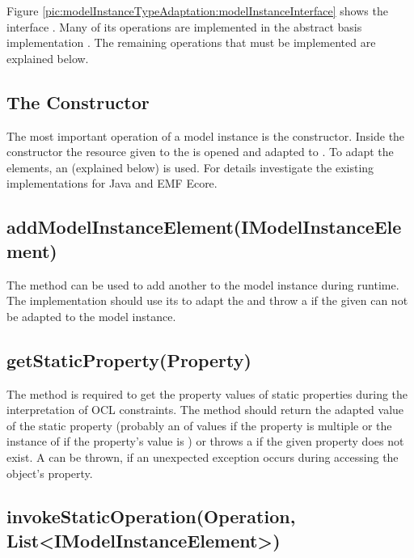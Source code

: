 Figure \ref{pic:modelInstanceTypeAdaptation:modelInstanceInterface} shows the interface . Many of its operations are implemented in the abstract basis implementation . The remaining operations that must be implemented are explained below.


\subsection{The Constructor}

The most important operation of a model instance is the constructor. Inside the constructor the resource given to the  is opened and adapted to . To adapt the elements, an  (explained below) is used. For details investigate the existing  implementations for Java and \acs{EMF} Ecore.


\subsection{addModelInstanceElement(IModelInstanceElement)}
\label{sect:modelInstanceTypeAdaptation:addIMIElement}

The method  can be used to add another  to the model instance during runtime. The implementation should use its  to adapt the  and throw a  if the given  can not be adapted to the model instance.


\subsection{getStaticProperty(Property)}

The method  is required to get the property values of static properties during the interpretation of \acs{OCL} constraints. The method should return the adapted value of the static property (probably an  of values if the property is multiple or the instance of  if the property's value is ) or throws a  if the given property does not exist. A  can be thrown, if an unexpected exception occurs during accessing the object's property.


\subsection{invokeStaticOperation(Operation, List<IModelInstanceElement>)}
			
